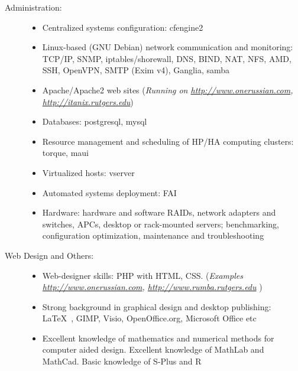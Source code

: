 \documentclass[10pt,overlapped,line]{res}
\newcommand{\wdescription}[1]{({\small \textit{#1}})}
\begin{document}
\begin{resume}
\begin{description}
    \item[Administration:] \hspace*{\fill}
      \begin{itemize}

      \item Centralized systems configuration: cfengine2

      \item Linux-based (GNU Debian) network communication and
        monitoring: TCP/IP, SNMP, iptables/shorewall, DNS, BIND, NAT,
        NFS, AMD, SSH, OpenVPN, SMTP (Exim v4), Ganglia, samba

      \item Apache/Apache2 web sites
        \wdescription{Running on
          \href{URL}{http://www.onerussian.com}, \href{URL}{http://itanix.rutgers.edu}}

      \item Databases: postgresql, mysql

      \item Resource management and scheduling of HP/HA computing
        clusters: torque, maui

      \item Virtualized hosts: vserver

      \item Automated systems deployment: FAI

      \item Hardware: hardware and software RAIDs, network adapters
        and switches, APCs, desktop or rack-mounted servers;
        benchmarking, configuration optimization, maintenance and
        troubleshooting

      \end{itemize}

    \item[Web Design and Others:]  \hspace*{\fill}
      \begin{itemize}
      \item Web-designer skills: PHP with HTML, CSS.
        \wdescription{Examples
          \href{URL}{http://www.onerussian.com},
          \href{URL}{http://www.rumba.rutgers.edu}
}
      \item Strong background in graphical design and desktop
        publishing: \LaTeX\ , GIMP, Visio, OpenOffice.org, Microsoft Office etc

      \item Excellent knowledge of mathematics and numerical methods
        for computer aided design. Excellent knowledge of MathLab and
        MathCad. Basic knowledge of S-Plus and R


\end{itemize}
\end{description}
\end{resume}
\end{document}

